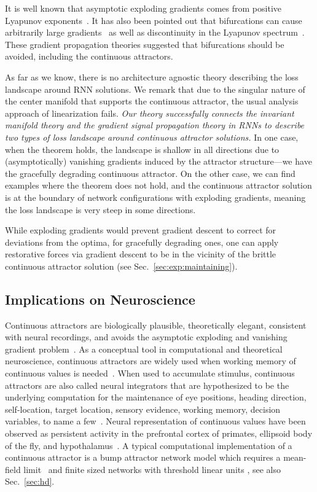\documentclass{article} %
\newcounter{ct}
\theoremstyle{definition}
\theoremstyle{remark}
\renewcommand{\cite}{\citep}
\begin{document}
It is well known that asymptotic exploding gradients comes from positive Lyapunov exponents~\cite{Mikhaeil2022,Vogt2022,Engelken2023}.
It has also been pointed out that bifurcations can cause arbitrarily large gradients~\cite{doya1993} as well as discontinuity in the Lyapunov spectrum~\cite{Park2023a}.
These gradient propagation theories suggested that bifurcations should be avoided, including the continuous attractors.

As far as we know, there is no architecture agnostic theory describing the loss landscape around RNN solutions.
We remark that due to the singular nature of the center manifold that supports the continuous attractor, the usual analysis approach of linearization fails.
\emph{Our theory successfully connects the invariant manifold theory and the gradient signal propagation theory in RNNs to describe two types of loss landscape around continuous attractor solutions.}
In one case, when the theorem holds, the landscape is shallow in all directions due to (asymptotically) vanishing gradients induced by the attractor structure---we have the gracefully degrading continuous attractor.
On the other case, we can find examples where the theorem does not hold, and the continuous attractor solution is at the boundary of network configurations with exploding gradients, meaning the loss landscape is very steep in some directions.

While exploding gradients would prevent gradient descent to correct for deviations from the optima,
for gracefully degrading ones, one can apply restorative forces via gradient descent to be in the vicinity of the brittle continuous attractor solution (see Sec.~\ref{sec:exp:maintaining}).


\subsection{Implications on Neuroscience}\label{sec:imp:neuroscience}
Continuous attractors are biologically plausible, theoretically elegant, consistent with neural recordings, and avoids the asymptotic exploding and vanishing gradient problem~\cite{Park2023a}.
As a conceptual tool in computational and theoretical neuroscience, continuous attractors are widely used when working memory of continuous values is needed~\cite{Dayan2001,Burak2009,Khona2022}.
When used to accumulate stimulus, continuous attractors are also called neural integrators that are hypothesized to be the underlying computation for the maintenance of eye positions, heading direction, self-location, target location, sensory evidence, working memory, decision variables, to name a few~\cite{seung1996,Seung2000,Romo1999}.
Neural representation of continuous values have been observed as persistent activity in the prefrontal cortex of primates, ellipsoid body of the fly, and hypothalamus~\cite{Romo1999,Noorman2022,Nair2023}.
A typical computational implementation of a continuous attractor is a bump attractor network model which requires a mean-field limit~\cite{Skaggs1995,Camperi1998,Renart2003} and finite sized networks with threshold linear units \cite{Noorman2022,Spalla2021}, see also Sec.~\ref{sec:hd}.
\end{document}
